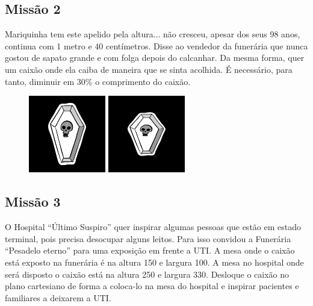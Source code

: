 \documentclass[
	12pt,				%
	oneside,			%
	a4paper,			%
	english,			%
	french,				%
	spanish,			%
	brazil,				%
	]{abntex2}
\begin{document}
\begin{apendicesenv}
\subsection{Missão 2}

Mariquinha tem este apelido pela altura... não cresceu, apesar dos seus 98 anos, continua com 1 metro e 40 centímetros. Disse ao vendedor da funerária que nunca gostou de sapato grande e com folga depois do calcanhar. Da mesma forma, quer um caixão onde ela caiba de maneira que se sinta acolhida. É necessário, para tanto, diminuir em 30\% o comprimento do caixão.

\begin{figure}[ht]
\centering
\includegraphics[width=0.3\textwidth]{imagens/desafios/coffin2dcenter.jpg}
\includegraphics[width=0.3\textwidth]{imagens/desafios/mission2.png}
\end{figure}

\subsection{Missão 3}

O Hospital “Último Suspiro” quer inspirar algumas pessoas que estão em estado terminal, pois precisa desocupar alguns leitos. Para isso convidou a Funerária “Pesadelo eterno” para uma exposição em frente a UTI. A mesa onde o caixão está exposto na funerária é na altura 150 e largura 100. A mesa no hospital onde será disposto o caixão está na altura 250 e largura 330. Desloque o caixão no plano cartesiano de forma a coloca-lo na mesa do hospital e inspirar pacientes e familiares a deixarem a UTI.


\end{apendicesenv}
\end{document}

